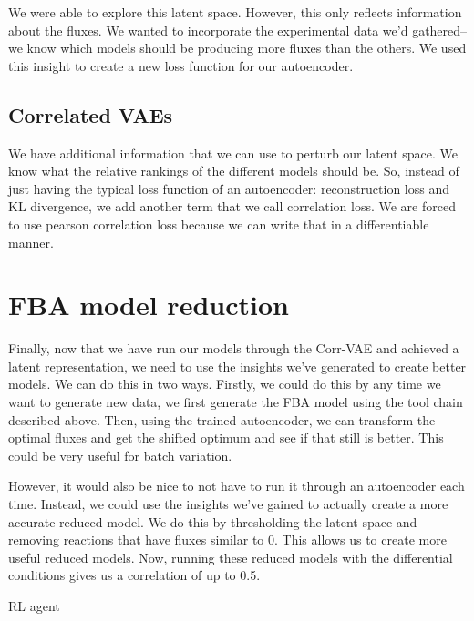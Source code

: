 We were able to explore this latent space.
However, this only reflects information about the fluxes.
We wanted to incorporate the experimental data we'd gathered--we know which models should be producing more fluxes than the others.
We used this insight to create a new loss function for our autoencoder.

\subsection{Correlated VAEs}
We have additional information that we can use to perturb our latent space.
We know what the relative rankings of the different models should be.
So, instead of just having the typical loss function of an autoencoder: reconstruction loss and KL divergence, we add another term that we call correlation loss.
We are forced to use pearson correlation loss because we can write that in a differentiable manner.

\section{FBA model reduction}
Finally, now that we have run our models through the Corr-VAE and achieved a latent representation, we need to use the insights we've generated to create better models.
We can do this in two ways.
Firstly, we could do this by any time we want to generate new data, we first generate the FBA model using the tool chain described above.
Then, using the trained autoencoder, we can transform the optimal fluxes and get the shifted optimum and see if that still is better.
This could be very useful for batch variation.

However, it would also be nice to not have to run it through an autoencoder each time.
Instead, we could use the insights we've gained to actually create a more accurate reduced model.
We do this by thresholding the latent space and removing reactions that have fluxes similar to 0.
This allows us to create more useful reduced models.
Now, running these reduced models with the differential conditions gives us a correlation of up to 0.5.

RL agent

\cite{ebrahim2013cobrapy}